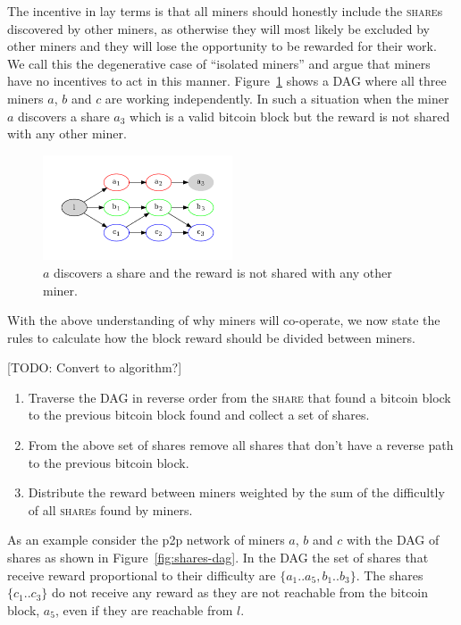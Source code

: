\documentclass{article}
\begin{document}
The incentive in lay terms is that all miners should honestly include
the \textsc{share}s discovered by other miners, as otherwise they will
most likely be excluded by other miners and they will lose the
opportunity to be rewarded for their work. We call this the
degenerative case of ``isolated miners'' and argue that miners have no
incentives to act in this manner. Figure~\ref{fig:isolated-miners}
shows a DAG where all three miners $a$, $b$ and $c$ are working
independently. In such a situation when the miner $a$ discovers a
share $a_3$ which is a valid bitcoin block but the reward is not
shared with any other miner.

\begin{figure}
  \begin{center}
    \includegraphics[width=0.5\textwidth]{isolated-miners}
    \caption{$a$ discovers a share and the reward is not shared with any
      other miner.}\label{fig:isolated-miners}
  \end{center}    
\end{figure}

With the above understanding of why miners will co-operate, we now
state the rules to calculate how the block reward should be divided
between miners.

[TODO: Convert to algorithm?]
\begin{enumerate}
\item Traverse the DAG in reverse order from the \textsc{share} that
  found a bitcoin block to the previous bitcoin block found and
  collect a set of shares.
\item From the above set of shares remove all shares that don't have
  a reverse path to the previous bitcoin block.
\item Distribute the reward between miners weighted by the sum of
  the difficultly of all \textsc{share}s found by miners.
\end{enumerate}

As an example consider the p2p network of miners $a$, $b$ and $c$ with
the DAG of shares as shown in Figure~\ref{fig:shares-dag}. In the DAG
the set of shares that receive reward proportional to their
difficulty are $\{a_1..a_5, b_1..b_3\}$. The shares $\{c_1..c_3\}$ do
not receive any reward as they are not reachable from the bitcoin
block, $a_5$, even if they are reachable from $l$.
\end{document}
